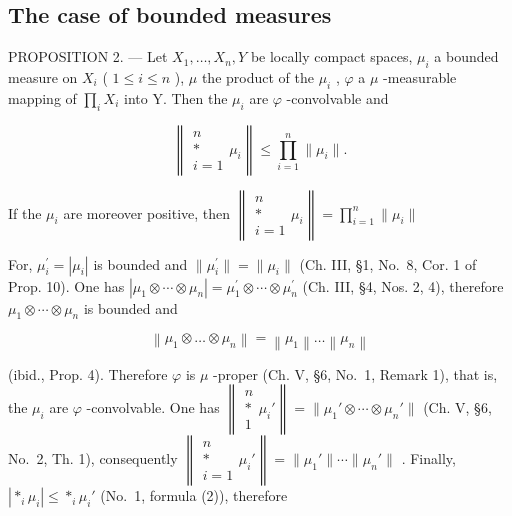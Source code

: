 \subsection{The case of bounded measures}

PROPOSITION 2. --- Let \(X_{1},\ldots,X_{n},Y\) be locally compact spaces, \(\mu_{i}\) a bounded measure on \(X_{i}\) ( \(1\leqslant i\leqslant n\) ), \(\mu\) the product of the \(\mu_{i}\) , \(\varphi\) a \(\mu\) -measurable mapping of \(\prod_{i}X_{i}\) into Y. Then the \(\mu_{i}\) are \(\varphi\) -convolvable and

\[
\left\| \begin{array}{c} n \\ * \\ i = 1 \end{array} \mu_ {i} \right\| \leqslant \prod_ {i = 1} ^ {n} \| \mu_ {i} \|.
\]

If the \(\mu_{i}\) are moreover positive, then \(\left\| \begin{array}{c}n\\ *\\ i = 1 \end{array} \mu_i\right\| = \prod_{i = 1}^{n}\| \mu_{i}\|\)

For, \(\mu_{i}^{\prime}=|\mu_{i}|\) is bounded and \(\|\mu_{i}^{\prime}\|=\|\mu_{i}\|\) (Ch. III, §1, No.~8, Cor. 1 of Prop. 10). One has \(|\mu_{1}\otimes\cdots\otimes\mu_{n}|=\mu_{1}^{\prime}\otimes\cdots\otimes\mu_{n}^{\prime}\) (Ch. III, §4, Nos. 2, 4), therefore \(\mu_{1}\otimes\cdots\otimes\mu_{n}\) is bounded and

\[
\left\| \mu_ {1} \otimes \dots \otimes \mu_ {n} \right\| = \left\| \mu_ {1} \right\| \dots \left\| \mu_ {n} \right\|
\]

(ibid., Prop. 4). Therefore \(\varphi\) is \(\mu\) -proper (Ch. V, §6, No.~1, Remark 1), that is, the \(\mu_i\) are \(\varphi\) -convolvable. One has \(\left\| \begin{array}{c} n \\ * \\ 1 \end{array} \mu_i'\right\| = \| \mu_1' \otimes \cdots \otimes \mu_n'\|\) (Ch. V, §6, No.~2, Th. 1), consequently \(\left\| \begin{array}{c} n \\ * \\ i=1 \end{array} \mu_i'\right\| = \| \mu_1'\| \cdots \| \mu_n'\|\) . Finally, \(| *_{i} \mu_i| \leqslant *_{i} \mu_i'\) (No.~1, formula (2)), therefore

